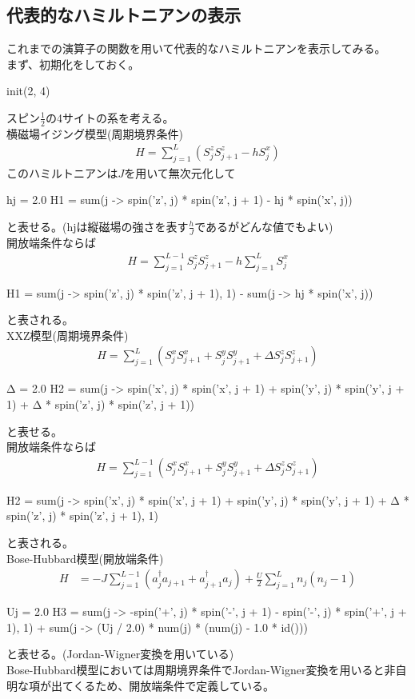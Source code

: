 \documentclass{ltjsarticle}
\begin{document}
\subsection*{代表的なハミルトニアンの表示}
これまでの演算子の関数を用いて代表的なハミルトニアンを表示してみる。\\
まず、初期化をしておく。
\begin{jllisting}
init(2, 4)
\end{jllisting}
スピン$\frac{1}{2}$の4サイトの系を考える。\\
横磁場イジング模型(周期境界条件)
\begin{align}
  H = \sum_{j=1}^{L} \left( S^z_j S^z_{j+1} - h S^x_{j} \right)
\end{align}
このハミルトニアンは$J$を用いて無次元化して
\begin{jllisting}
hj = 2.0
H1 = sum(j -> spin('z', j) * spin('z', j + 1) - hj * spin('x', j))
\end{jllisting}
と表せる。(hjは縦磁場の強さを表す$\frac{h}{J}$であるがどんな値でもよい)\\
開放端条件ならば
\begin{align}
  H = \sum_{j=1}^{L-1} S^z_j S^z_{j+1} - h \sum_{j=1}^{L} S^x_{j}
\end{align}
\begin{jllisting}
H1 = sum(j -> spin('z', j) * spin('z', j + 1), 1) - sum(j -> hj * spin('x', j))
\end{jllisting}
と表される。\\
XXZ模型(周期境界条件)
\begin{align}
  H = \sum_{j=1}^{L} \left( S^x_j S^x_{j+1} + S^y_j S^y_{j+1} + \Delta S^z_j S^z_{j+1} \right)
\end{align}
\begin{jllisting}
Δ = 2.0
H2 = sum(j -> spin('x', j) * spin('x', j + 1) + spin('y', j) * spin('y', j + 1) + Δ * spin('z', j) * spin('z', j + 1))
\end{jllisting}
と表せる。\\
開放端条件ならば
\begin{align}
  H = \sum_{j=1}^{L-1} \left( S^x_j S^x_{j+1} + S^y_j S^y_{j+1} + \Delta S^z_j S^z_{j+1} \right)
\end{align}
\begin{jllisting}
H2 = sum(j -> spin('x', j) * spin('x', j + 1) + spin('y', j) * spin('y', j + 1) + Δ * spin('z', j) * spin('z', j + 1), 1)
\end{jllisting}
と表される。\\
Bose-Hubbard模型(開放端条件)
\begin{align}
  H &= -J\sum_{j=1}^{L-1} \left( a_j^\dagger a_{j+1} + a_{j+1}^\dagger a_j \right) + \frac{U}{2}\sum_{j=1}^{L} n_j(n_j-1)
\end{align}
\begin{jllisting}
Uj = 2.0
H3 = sum(j -> -spin('+', j) * spin('-', j + 1) - spin('-', j) * spin('+', j + 1), 1) + sum(j -> (Uj / 2.0) * num(j) * (num(j) - 1.0 * id()))
\end{jllisting}
と表せる。(Jordan-Wigner変換を用いている)\\
Bose-Hubbard模型においては周期境界条件でJordan-Wigner変換を用いると非自明な項が出てくるため、開放端条件で定義している。\\
\end{document}
